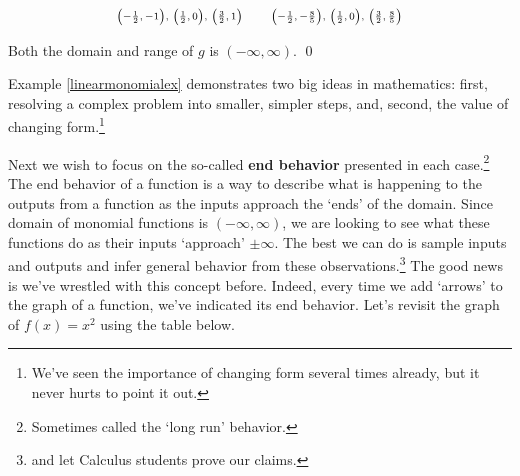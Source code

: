 \begin{ex}
\begin{enumerate}
\[\begin{array}{rcl}
 \text{\scriptsize  $\left(-\frac{1}{2},-1 \right)$, $\left(\frac{1}{2},0 \right)$, $\left(\frac{3}{2},1 \right)$} & & \text{\scriptsize  $\left(-\frac{1}{2},-\frac{8}{5} \right)$, $\left(\frac{1}{2},0 \right)$, $\left(\frac{3}{2},\frac{8}{5} \right)$} \\
 
 \end{array} \]
 
 Both the domain and range of $g$ is $(-\infty, \infty)$. \qed
 
 \end{enumerate} 

 
\end{ex}


Example \ref{linearmonomialex} demonstrates two big ideas in mathematics:  first, resolving a complex problem into smaller, simpler steps, and, second, the value of changing form.\footnote{We've seen the importance of changing form several times already, but it never hurts to point it out.}

Next  we wish  to focus on the so-called  \textbf{end behavior} presented in each case.\footnote{Sometimes called the `long run' behavior.}  The end behavior of a function is a way to describe what is happening to the outputs from a function as the inputs approach the `ends' of the domain. Since domain of monomial functions is $(-\infty, \infty)$, we are looking to see what these functions do as their inputs `approach' $\pm \infty$.  The best we can do is sample inputs and outputs and infer general behavior from these observations.\footnote{and let Calculus students prove our claims.}  The good news is we've wrestled with this concept before. Indeed, every time we add `arrows' to the graph of a function, we've indicated its end behavior. Let's revisit  the graph of $f(x) = x^2$ using the table below.


 
 
